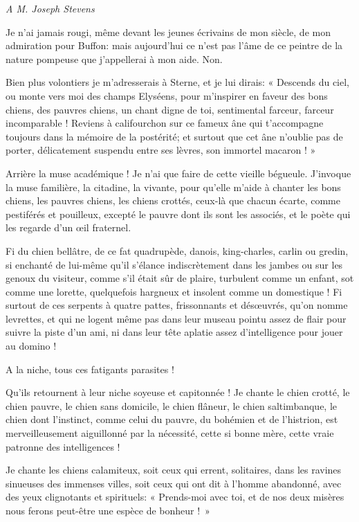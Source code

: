 \begin{flushright}
\textit{A M. Joseph Stevens} 
\end{flushright}

Je n’ai jamais rougi, même devant les jeunes écrivains
de mon siècle, de mon admiration pour Buffon: mais
aujourd’hui ce n’est pas
l’âme de ce peintre de la nature pompeuse que
j’appellerai à mon aide. Non.

Bien plus volontiers je m’adresserais à Sterne, et je
lui dirais: « Descends du ciel, ou monte vers moi des champs Elyséens,
pour m’inspirer en faveur des bons chiens, des pauvres
chiens, un chant digne de toi, sentimental farceur, farceur
incomparable ! Reviens à califourchon sur ce fameux âne qui
t’accompagne toujours dans la mémoire de la postérité;
et surtout que cet âne n’oublie pas de porter,
délicatement suspendu entre ses lèvres, son immortel macaron ! »

Arrière la muse académique ! Je n’ai que faire de cette
vieille bégueule. J’invoque la muse familière, la
citadine, la vivante, pour qu’elle
m’aide à chanter les bons chiens, les pauvres chiens,
les chiens crottés, ceux{}-là que chacun écarte, comme pestiférés et
pouilleux, excepté le pauvre dont ils sont les associés, et le poète
qui les regarde d’un \oe il fraternel.

Fi du chien bellâtre, de ce fat quadrupède, danois, king{}-charles,
carlin ou gredin, si enchanté de lui{}-même qu’il
s’élance indiscrètement dans les jambes ou sur les
genoux du visiteur, comme s’il était sûr de plaire,
turbulent comme un enfant, sot comme une lorette, quelquefois hargneux
et insolent comme un domestique ! Fi surtout de ces serpents à quatre
pattes, frissonnants et dés\oe uvrés, qu’on nomme
levrettes, et qui ne logent même pas dans leur museau pointu assez de
flair pour suivre la piste d’un ami, ni dans leur tête
aplatie assez d’intelligence pour jouer au domino !

A la niche, tous ces fatigants parasites !

Qu’ils retournent à leur niche soyeuse et capitonnée !
Je chante le chien crotté, le chien pauvre, le chien sans domicile, le
chien flâneur, le chien saltimbanque, le chien dont
l’instinct, comme celui du pauvre, du bohémien et de
l’histrion, est merveilleusement aiguillonné par la
nécessité, cette si bonne mère, cette vraie patronne des intelligences
!

Je chante les chiens calamiteux, soit ceux qui errent, solitaires, dans
les ravines sinueuses des immenses villes, soit ceux qui ont dit à
l’homme abandonné, avec des yeux clignotants et
spirituels: « Prends{}-moi avec toi, et de nos deux misères nous ferons
peut{}-être une espèce de bonheur !~»


